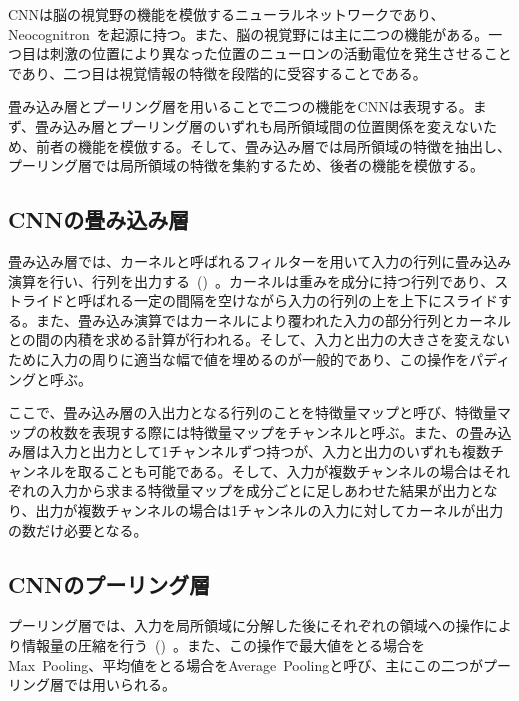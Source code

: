 CNNは脳の視覚野の機能を模倣するニューラルネットワークであり、Neocognitron~\cite{neocognitron}を起源に持つ。また、脳の視覚野には主に二つの機能がある。一つ目は刺激の位置により異なった位置のニューロンの活動電位を発生させることであり、二つ目は視覚情報の特徴を段階的に受容することである。

畳み込み層とプーリング層を用いることで二つの機能をCNNは表現する。まず、畳み込み層とプーリング層のいずれも局所領域間の位置関係を変えないため、前者の機能を模倣する。そして、畳み込み層では局所領域の特徴を抽出し、プーリング層では局所領域の特徴を集約するため、後者の機能を模倣する。


\subsection{CNNの畳み込み層}

畳み込み層では、カーネルと呼ばれるフィルターを用いて入力の行列に畳み込み演算を行い、行列を出力する~()~。カーネルは重みを成分に持つ行列であり、ストライドと呼ばれる一定の間隔を空けながら入力の行列の上を上下にスライドする。また、畳み込み演算ではカーネルにより覆われた入力の部分行列とカーネルとの間の内積を求める計算が行われる。そして、入力と出力の大きさを変えないために入力の周りに適当な幅で値を埋めるのが一般的であり、この操作をパディングと呼ぶ。

ここで、畳み込み層の入出力となる行列のことを特徴量マップと呼び、特徴量マップの枚数を表現する際には特徴量マップをチャンネルと呼ぶ。また、の畳み込み層は入力と出力として1チャンネルずつ持つが、入力と出力のいずれも複数チャンネルを取ることも可能である。そして、入力が複数チャンネルの場合はそれぞれの入力から求まる特徴量マップを成分ごとに足しあわせた結果が出力となり、出力が複数チャンネルの場合は1チャンネルの入力に対してカーネルが出力の数だけ必要となる。

\subsection{CNNのプーリング層}

プーリング層では、入力を局所領域に分解した後にそれぞれの領域への操作により情報量の圧縮を行う~()~。また、この操作で最大値をとる場合をMax~Pooling、平均値をとる場合をAverage~Poolingと呼び、主にこの二つがプーリング層では用いられる。

